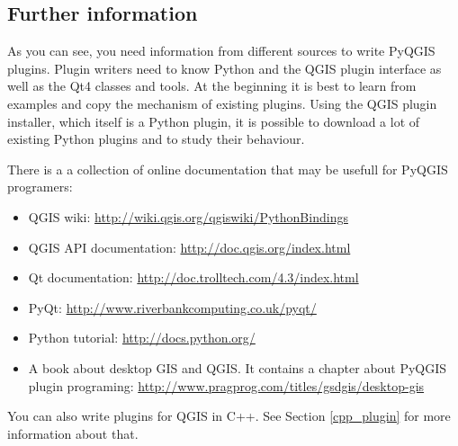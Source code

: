 \subsection{Further information}

As you can see, you need information from different sources to write PyQGIS
plugins. Plugin writers need to know Python and the QGIS plugin interface as
well as the Qt4 classes and tools. At the beginning it is best to learn from
examples and copy the mechanism of existing plugins. Using the QGIS plugin
installer, which itself is a Python plugin, it is possible to download a lot
of existing Python plugins and to study their behaviour.

There is a a collection of online documentation that may be usefull for
PyQGIS programers:
 
\begin{itemize}
\item QGIS wiki: \url{http://wiki.qgis.org/qgiswiki/PythonBindings}
\item QGIS API documentation: \url{http://doc.qgis.org/index.html}
\item Qt documentation: \url{http://doc.trolltech.com/4.3/index.html}
\item PyQt: \url{http://www.riverbankcomputing.co.uk/pyqt/}
\item Python tutorial: \url{http://docs.python.org/}
\item A book about desktop GIS and QGIS. It contains a chapter about PyQGIS
plugin programing: \url{http://www.pragprog.com/titles/gsdgis/desktop-gis} 
\end{itemize}

You can also write plugins for QGIS in C++. See Section \ref{cpp_plugin} for
more information about that.

